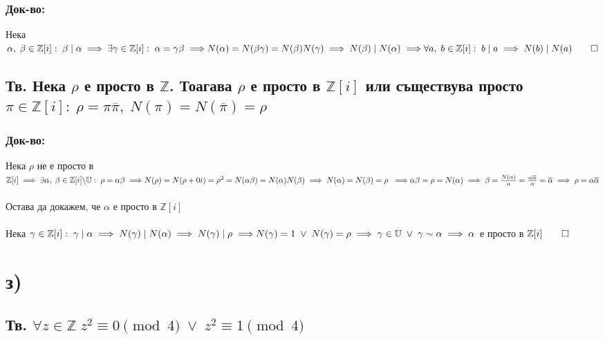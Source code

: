 \documentclass[12pt]{article}
\newcommand{\Z}{\mathbb{Z}}
\newcommand{\Rev}{\mathbb{U}}
\begin{document}
    \subsubsection*{Док-во:}
    Нека \(\alpha, \; \beta \in \Z[i] : \; \beta \; | \; \alpha \implies \exists \gamma \in \Z[i]: \; \alpha = \gamma\beta \implies \\\\
    N(\alpha) = N(\beta\gamma) = N(\beta)N(\gamma) \implies N(\beta) \; | \; N(\alpha) \implies \\\\
    \forall a, \; b \in \Z[i]: \; b \; | \; a \implies N(b) \; | \; N(a) \qed \)
    \subsection*{Тв. Нека \(\rho\) е просто в \(\Z\). Тоагава \(\rho\) е просто в \(\Z[i]\) или съществува просто \(\pi \in \Z[i] : \; \rho = \pi\overline{\pi}, \; N(\pi) = N(\overline{\pi}) = \rho\) } 
    \subsubsection*{Док-во:}
    Нека \(\rho\) не е просто в \(\Z[i] \implies \exists \alpha, \; \beta \in \Z[i]\backslash\Rev: \; \rho = \alpha\beta \implies \\\\
    N(\rho) = N(\rho + 0i) = \rho^2 = N(\alpha\beta) = N(\alpha)N(\beta) \implies N(\alpha) = N(\beta) = \rho\ \implies \\\\
    \alpha\beta = \rho = N(\alpha) \implies \beta = \frac{N(\alpha)}{\alpha} = \frac{\alpha\overline{\alpha}}{\alpha} = \overline{\alpha} \implies \rho = \alpha\overline{\alpha} \) \\\\
    Остава да докажем, че \(\alpha\) е просто в \(\Z[i]\) \\\\
    Нека \(\gamma \in \Z[i]: \; \gamma \; | \; \alpha \implies N(\gamma) \; | \; N(\alpha) \implies N(\gamma) \; | \; \rho \implies \\\\
    N(\gamma) = 1 \; \vee \;  N(\gamma) = \rho \implies \gamma \in \Rev \; \vee \; \gamma \sim \alpha \implies \alpha \) е просто в \(\Z[i] \qed \)
    \section*{з)}
    \subsection*{Тв. \(\forall z \in \Z \; z^2 \equiv 0 \pmod 4 \; \vee \; z^2 \equiv 1 \pmod 4\) } 
\end{document}
